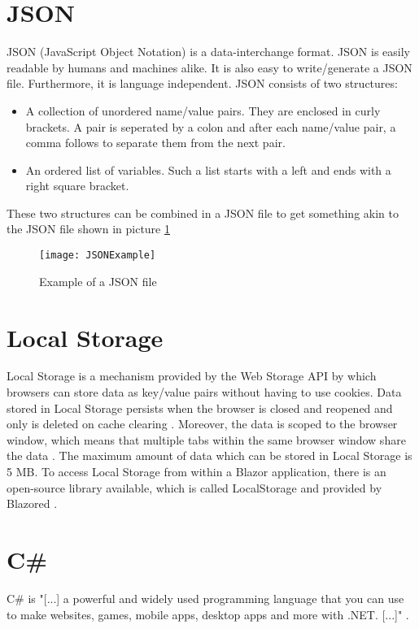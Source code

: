 \section{JSON}
JSON (JavaScript Object Notation) \cite{json_url} is a data-interchange format. JSON is easily readable by humans and machines alike. It is also easy to write/generate a JSON file. Furthermore, it is language independent.\newline
JSON consists of two structures:
\begin{itemize}
	\item A collection of unordered name/value pairs. They are enclosed in curly brackets. A pair is seperated by a colon and after each name/value pair, a comma follows to separate them from the next pair.
	\item An ordered list of variables. Such a list starts with a left and ends with a right square bracket.
\end{itemize}
These two structures can be combined in a JSON file to get something akin to the JSON file shown in picture \ref{figure4}

\begin{figure}[H]
	\centering
	\texttt{[image: JSONExample]}
	\caption{Example of a JSON file}
	\label{figure4}
\end{figure}

\section{Local Storage} \label{Local Storage}
Local Storage is a mechanism provided by the Web Storage API by which browsers can store data as key/value pairs without having to use cookies. Data stored in Local Storage persists when the browser is closed and reopened and only is deleted on cache clearing \cite{web-storage-api-url}. Moreover, the data is scoped to the browser window, which means that multiple tabs within the same browser window share the data \cite{blazor-state-management-url}. The maximum amount of data which can be stored in Local Storage is 5 MB. To access Local Storage from within a Blazor application, there is an open-source library available, which is called LocalStorage and provided by Blazored \cite{local-storage-url}.

\section{C\#}
C\# is "[...] a powerful and widely used programming language that you can use to make websites, games, mobile apps, desktop apps and more with .NET. [...]" \cite{csharp-url}.